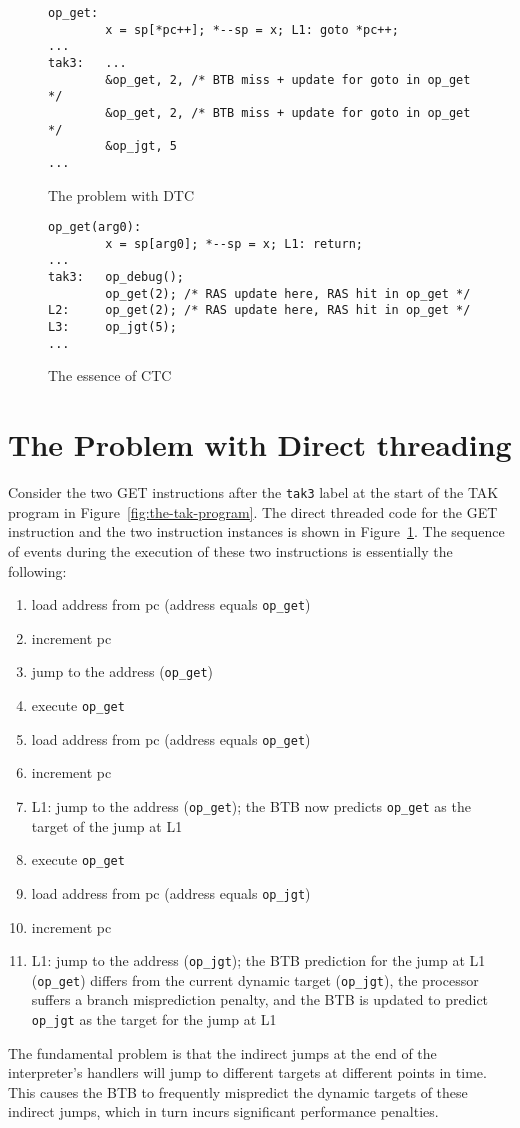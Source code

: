 \documentclass[10pt,a4paper]{article}
\begin{document}
%
\begin{figure}[htb]
\begin{verbatim}
op_get:
        x = sp[*pc++]; *--sp = x; L1: goto *pc++;
...
tak3:   ...
        &op_get, 2, /* BTB miss + update for goto in op_get */
        &op_get, 2, /* BTB miss + update for goto in op_get */
        &op_jgt, 5
...
\end{verbatim}
\caption{The problem with DTC}
\label{fig:the-problem-with-dtc}
\end{figure}
%
\begin{figure}[htb]
\begin{verbatim}
op_get(arg0):
        x = sp[arg0]; *--sp = x; L1: return;
...
tak3:   op_debug();
        op_get(2); /* RAS update here, RAS hit in op_get */
L2:     op_get(2); /* RAS update here, RAS hit in op_get */
L3:     op_jgt(5);
...
\end{verbatim}
\caption{The essence of CTC}
\label{fig:the-essence-of-ctc}
\end{figure}
%
\section{The Problem with Direct threading}
Consider the two GET instructions after the
\texttt{tak3} label at the start of the TAK
program in Figure~\ref{fig:the-tak-program}.
The direct threaded code for the GET instruction
and the two instruction instances is shown in
Figure~\ref{fig:the-problem-with-dtc}.
The sequence of events during the execution of
these two instructions is essentially the following:

\begin{enumerate}
\item load address from pc (address equals \texttt{op\_get})
\item increment pc
\item jump to the address (\texttt{op\_get})
\item execute \texttt{op\_get}
\item load address from pc (address equals \texttt{op\_get})
\item increment pc
\item L1: jump to the address (\texttt{op\_get});
the BTB now predicts \texttt{op\_get} as the target of the jump at L1
\item execute \texttt{op\_get}
\item load address from pc (address equals \texttt{op\_jgt})
\item increment pc
\item L1: jump to the address (\texttt{op\_jgt});
the BTB prediction for the jump at L1 (\texttt{op\_get}) differs from the
current dynamic target (\texttt{op\_jgt}), the processor suffers a branch
misprediction penalty, and the BTB is updated to predict \texttt{op\_jgt}
as the target for the jump at L1
\end{enumerate}
\par\noindent The fundamental problem is that the indirect jumps at
the end of the interpreter's handlers
will jump to different targets at different points in
time. This causes the BTB to frequently mispredict the
dynamic targets of these indirect jumps, which in turn
incurs significant performance penalties.
%
\end{document}
